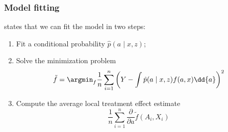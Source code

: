 \documentclass{article}
\begin{document}
\subsubsection{Model fitting}
 states that we can fit the model in two steps:
\begin{enumerate}
    \item Fit a conditional probability \(\hat{p}(a\mid x, z)\);
    \item Solve the minimization problem
    \begin{equation*}
        \tilde{f} = \argmin_f \frac{1}{n}\sum_{i=1}^n\left(Y - \int \hat{p}(a\mid x, z)f(a, x)\dd{a}\right)^2
    \end{equation*}
    \item Compute the average local treatment effect estimate
    \begin{equation*}
        \frac{1}{n}\sum_{i = 1}^n\frac{\partial}{\partial a}\tilde f(A_i, X_i)
    \end{equation*}
\end{enumerate}
\end{document}
